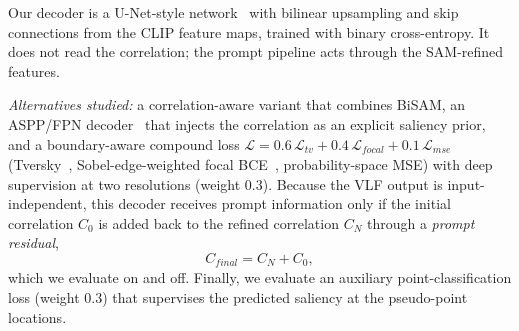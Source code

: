 \begin{revpar}
Our decoder is a U-Net-style network~\cite{ronneberger2015u} with bilinear
upsampling and skip connections from the CLIP feature maps, trained with binary
cross-entropy. It does not read the correlation; the prompt pipeline acts through
the SAM-refined features.

\noindent\textit{Alternatives studied:} a correlation-aware variant that combines
BiSAM, an ASPP/FPN decoder~\cite{chen2017rethinking,lin2017feature} that injects
the correlation as an explicit saliency prior, and a boundary-aware compound loss
$\mathcal{L} = 0.6\,\mathcal{L}_{\textit{tv}} + 0.4\,\mathcal{L}_{\textit{focal}} +
0.1\,\mathcal{L}_{\textit{mse}}$ (Tversky~\cite{salehi2017tversky},
Sobel-edge-weighted focal BCE~\cite{lin2017focal}, probability-space MSE) with deep
supervision at two resolutions (weight $0.3$). Because the VLF output is
input-independent, this decoder receives prompt information only if the initial
correlation $C_0$ is added back to the refined correlation $C_N$ through a
\emph{prompt residual},
\begin{equation}
  C_{\textit{final}} = C_N + C_0 ,
  \label{eq:residual}
\end{equation}
which we evaluate on and off. Finally, we evaluate an auxiliary
point-classification loss (weight $0.3$) that supervises the predicted saliency at
the pseudo-point locations.
\end{revpar}
